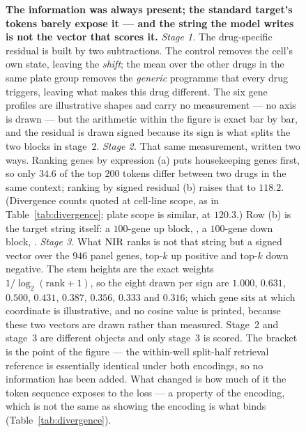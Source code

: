 \begin{figure}[htbp]
\begin{fullwidth}
\caption[The residual, the target string and the scored vector]{\textbf{The
information was always present; the standard target's tokens barely expose it
--- and the string the model writes is not the vector that scores it.}
\emph{Stage 1.} The drug-specific residual is built by two subtractions. The
control removes the cell's own state, leaving the \emph{shift}; the mean over
the other drugs in the same plate group removes the \emph{generic} programme
that every drug triggers, leaving what makes this drug different. The six
gene profiles are illustrative shapes and carry no measurement --- no axis is
drawn --- but the arithmetic within the figure is exact bar by bar, and the
residual is drawn signed because its sign is what splits the two blocks in
stage~2. \emph{Stage 2.} That same measurement, written two ways. Ranking genes
by expression (a) puts housekeeping genes first, so only $34.6$ of the top $200$
tokens differ between two drugs in the same context; ranking by signed residual
(b) raises that to $118.2$. (Divergence counts quoted at cell-line scope, as in
Table~\ref{tab:divergence}; plate scope is similar, at $120.3$.) Row (b) is the
target string itself: a $100$-gene up block, \DOWN, a $100$-gene down block,
\ENDCELL. \emph{Stage 3.} What $\textrm{NIR}$ ranks is not that string but a signed
vector over the $946$ panel genes, top-$k$ up positive and top-$k$ down
negative. The stem heights are the exact weights $1/\log_2(\textrm{rank}+1)$, so
the eight drawn per sign are $1.000$, $0.631$, $0.500$, $0.431$, $0.387$,
$0.356$, $0.333$ and $0.316$; which gene sits at which coordinate is
illustrative, and no cosine value is printed, because these two vectors are
drawn rather than measured. Stage~2 and stage~3 are different objects and only
stage~3 is scored. The bracket is the point of the figure --- the within-well
split-half retrieval reference is essentially identical under both encodings, so
no information has been added. What changed is how much of it the token sequence
exposes to the loss --- a property of the encoding, which is not the same as
showing the encoding is what binds (Table~\ref{tab:divergence}).}
\label{fig:frame}
\end{fullwidth}
\end{figure}
